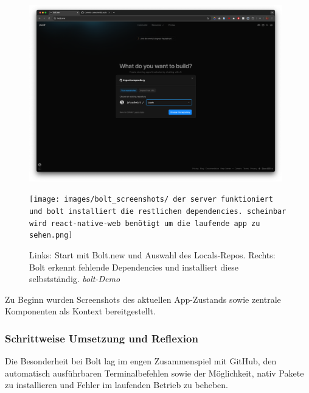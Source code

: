\begin{figure}[htbp]
      \centering
      \begin{minipage}{0.48\textwidth}
            \centering
            \includegraphics[width=0.98\textwidth]{images/bolt_screenshots/startseite-what-do-you-wanna-build-mit-github-branch.png}
      \end{minipage}
      \hfill
      \begin{minipage}{0.48\textwidth}
            \centering
            \texttt{[image: images/bolt\_screenshots/ der server funktioniert und bolt installiert die restlichen dependencies. scheinbar wird react-native-web benötigt um die laufende app zu sehen.png]}
      \end{minipage}
      \caption{Links: Start mit Bolt.new und Auswahl des Locals-Repos. Rechts: Bolt erkennt fehlende Dependencies und installiert diese selbstständig. \textit{bolt-Demo}}
      \label{fig:bolt-setup}
\end{figure}

Zu Beginn wurden Screenshots des aktuellen App-Zustands sowie zentrale
Komponenten als Kontext bereitgestellt.

\subsubsection{Schrittweise Umsetzung und Reflexion}
Die Besonderheit bei Bolt lag im engen Zusammenspiel mit GitHub, den
automatisch ausführbaren Terminalbefehlen sowie der Möglichkeit, nativ Pakete
zu installieren und Fehler im laufenden Betrieb zu beheben.

